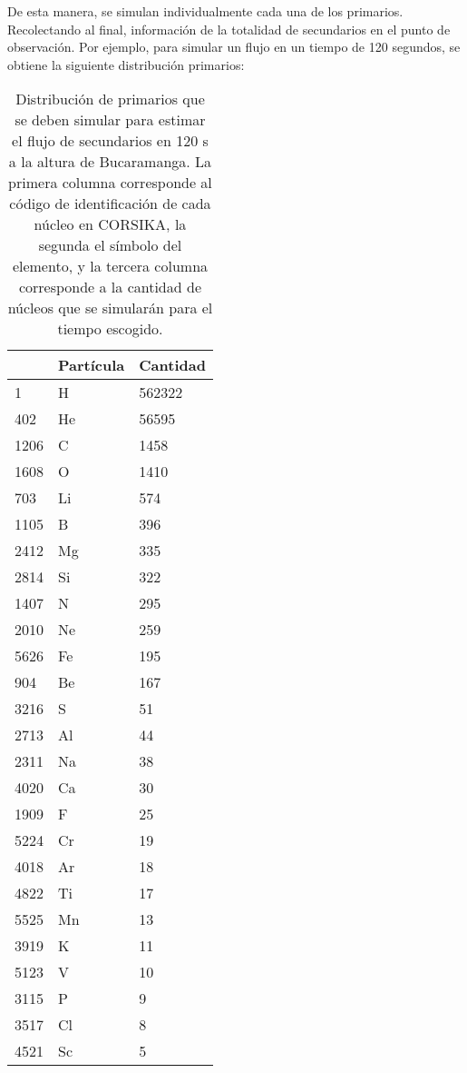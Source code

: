 De esta manera, se simulan individualmente cada una de los primarios. Recolectando al final, información de la totalidad de secundarios en el punto de observación. Por ejemplo, para simular un flujo en un tiempo de 120 segundos, se obtiene la siguiente distribución primarios:
\begin{table}[htb!]
\scriptsize
			\begin{center}
\begin{tabular}{|l|l|l|}
\hline
\rowcolor[HTML]{9ED8E8} 
\multicolumn{1}{|c|}{\cellcolor[HTML]{9ED8E8}\textbf{ID}} & \multicolumn{1}{c|}{\cellcolor[HTML]{9ED8E8}\textbf{Partícula}} & \multicolumn{1}{c|}{\cellcolor[HTML]{9ED8E8}\textbf{Cantidad}} \\ \hline
1 & H & 562322 \\ \hline
402 & He & 56595 \\ \hline
1206 & C & 1458 \\ \hline
1608 & O & 1410 \\ \hline
703 & Li & 574 \\ \hline
1105 & B & 396 \\ \hline
2412 & Mg & 335 \\ \hline
2814 & Si & 322 \\ \hline
1407 & N & 295 \\ \hline
2010 & Ne & 259 \\ \hline
5626 & Fe & 195 \\ \hline
904 & Be & 167 \\ \hline
3216 & S & 51 \\ \hline
2713 & Al & 44 \\ \hline
2311 & Na & 38 \\ \hline
4020 & Ca & 30 \\ \hline
1909 & F & 25 \\ \hline
5224 & Cr & 19 \\ \hline
4018 & Ar & 18 \\ \hline
4822 & Ti & 17 \\ \hline
5525 & Mn & 13 \\ \hline
3919 & K & 11 \\ \hline
5123 & V & 10 \\ \hline
3115 & P & 9 \\ \hline
3517 & Cl & 8 \\ \hline
4521 & Sc & 5 \\ \hline
\end{tabular}
\end{center} %
			\caption[Distribución de primarios en un tiempo de 120 segundos.]{Distribución de primarios que se deben simular para estimar el flujo de secundarios en 120 s a la altura de Bucaramanga. La primera columna corresponde al código de identificación de cada núcleo en CORSIKA, la segunda el símbolo del elemento, y la tercera columna corresponde a la cantidad de núcleos que se simularán para el tiempo escogido.}
			\label{tab:tabla2}
\end{table}\\



